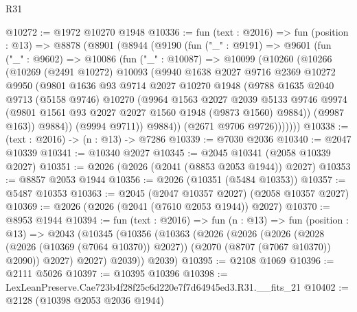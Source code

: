 \begin{lexlean}{R31}
\begin{coremodule}
@10272 := @1972 @10270 @1948
@10336 := fun (text : @2016) =>
  fun (position : @13) =>
  @8878
    (@8901
      (@8944
        (@9190
          (fun ("_" : @9191) =>
          @9601
            (fun ("_" : @9602) =>
            @10086
              (fun ("_" : @10087) =>
              @10099
                (@10260
                  (@10266
                    (@10269
                      (@2491 @10272)
                      @10093
                      (@9940
                        @1638
                        @2027
                        @9716
                        @2369
                        @10272
                        @9950
                        (@9801
                          @1636
                          @93
                          @9714
                          @2027
                          @10270
                          @1948
                          (@9788
                            @1635
                            @2040
                            @9713
                            (@5158 @9746)
                            @10270
                            (@9964
                              @1563
                              @2027
                              @2039
                              @5133
                              @9746
                              @9974
                              (@9801 @1561 @93 @2027 @2027 @1560 @1948 (@9873 @1560) @9884))
                            (@9987 @163))
                          @9884))
                      (@9994 @9711))
                    @9884))
                (@2671 @9706 @9726)))))))
@10338 := (text : @2016) -> (n : @13) -> @7286
@10339 := @7030 @2036
@10340 := @2047 @10339
@10341 := @10340 @2027
@10345 := @2045 @10341 (@2058 @10339 @2027)
@10351 := @2026 (@2026 (@2041 (@8853 @2053 @1944)) @2027)
@10353 := @8857 @2053 @1944
@10356 := @2026 (@10351 (@5484 @10353))
@10357 := @5487 @10353
@10363 := @2045 (@2047 @10357 @2027) (@2058 @10357 @2027)
@10369 := @2026 (@2026 (@2041 (@7610 @2053 @1944)) @2027)
@10370 := @8953 @1944
@10394 := fun (text : @2016) =>
  fun (n : @13) =>
  fun (position : @13) =>
  @2043
    (@10345
      (@10356
        (@10363
          (@2026
            (@2026
              (@2026
                (@2028 (@2026 (@10369 (@7064 @10370)) @2027))
                (@2070 (@8707 (@7067 @10370)) @2090))
              @2027)
            @2027)
          @2039))
      @2039)
@10395 := @2108 @1069
@10396 := @2111 @5026
@10397 := @10395 @10396
@10398 := LexLeanPreserve.Cae723b4f28f25c6d220e7f7d64945ed3.R31.__fits_21
@10402 := @2128 (@10398 @2053 @2036 @1944)

\end{coremodule}
\end{lexlean}
